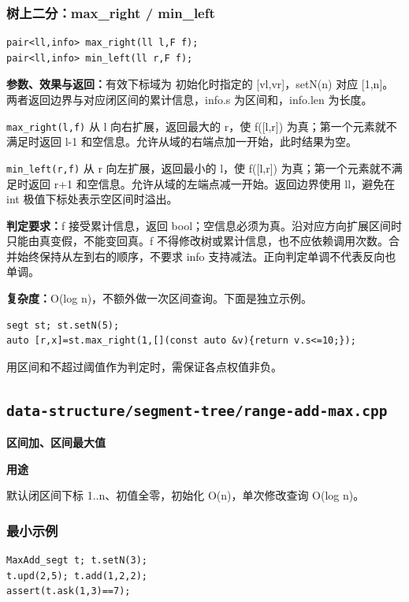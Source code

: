 \documentclass[UTF8,a4paper,10pt]{ctexart}
\newcommand{\TemplUsage}[1]{\textbf{用途}\par #1\par}
\begin{document}
\noindent\begin{minipage}{\textwidth}
\subsubsection*{树上二分：max\_right / min\_left}
\begin{lstlisting}
pair<ll,info> max_right(ll l,F f);
pair<ll,info> min_left(ll r,F f);
\end{lstlisting}
\textbf{参数、效果与返回：}有效下标域为 初始化时指定的 [vl,vr]，setN(n) 对应 [1,n]。两者返回边界与对应闭区间的累计信息，info.s 为区间和，info.len 为长度。

\texttt{max\_right(l,f)} 从 l 向右扩展，返回最大的 r，使 f([l,r]) 为真；第一个元素就不满足时返回 l-1 和空信息。允许从域的右端点加一开始，此时结果为空。

\texttt{min\_left(r,f)} 从 r 向左扩展，返回最小的 l，使 f([l,r]) 为真；第一个元素就不满足时返回 r+1 和空信息。允许从域的左端点减一开始。返回边界使用 ll，避免在 int 极值下标处表示空区间时溢出。

\textbf{判定要求：}f 接受累计信息，返回 bool；空信息必须为真。沿对应方向扩展区间时只能由真变假，不能变回真。f 不得修改树或累计信息，也不应依赖调用次数。合并始终保持从左到右的顺序，不要求 info 支持减法。正向判定单调不代表反向也单调。

\textbf{复杂度：}O(log n)，不额外做一次区间查询。下面是独立示例。
\begin{lstlisting}
segt st; st.setN(5);
auto [r,x]=st.max_right(1,[](const auto &v){return v.s<=10;});
\end{lstlisting}
用区间和不超过阈值作为判定时，需保证各点权值非负。
\end{minipage}\par
\clearpage
\subsection{\texttt{data-structure/segment-tree/range-add-max.cpp}}
\textbf{区间加、区间最大值}\par
\TemplUsage{默认闭区间下标 1..n、初值全零，初始化 O(n)，单次修改查询 O(log n)。}
\subsubsection*{最小示例}
\begin{lstlisting}
MaxAdd_segt t; t.setN(3);
t.upd(2,5); t.add(1,2,2);
assert(t.ask(1,3)==7);
\end{lstlisting}
\end{document}
